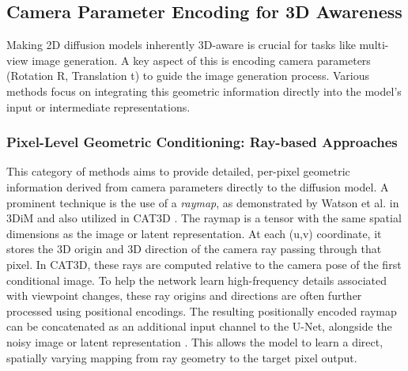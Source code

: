 \subsection{Camera Parameter Encoding for 3D Awareness}\label{ssec:camera_param_encoding}
Making 2D diffusion models inherently 3D-aware is crucial for tasks like multi-view image generation. A key aspect of this is encoding camera parameters (Rotation R, Translation t) to guide the image generation process. Various methods focus on integrating this geometric information directly into the model's input or intermediate representations.

\subsubsection{Pixel-Level Geometric Conditioning: Ray-based Approaches}
This category of methods aims to provide detailed, per-pixel geometric information derived from camera parameters directly to the diffusion model.
A prominent technique is the use of a \textit{raymap}, as demonstrated by Watson et al. \cite{novelviewsynthesisdiffusion} in 3DiM and also utilized in CAT3D \cite{cat3d}. The raymap is a tensor with the same spatial dimensions as the image or latent representation. At each (u,v) coordinate, it stores the 3D origin and 3D direction of the camera ray passing through that pixel. In CAT3D, these rays are computed relative to the camera pose of the first conditional image.
To help the network learn high-frequency details associated with viewpoint changes, these ray origins and directions are often further processed using positional encodings.
The resulting positionally encoded raymap can be concatenated as an additional input channel to the U-Net, alongside the noisy image or latent representation \cite{novelviewsynthesisdiffusion, cat3d}. This allows the model to learn a direct, spatially varying mapping from ray geometry to the target pixel output.

